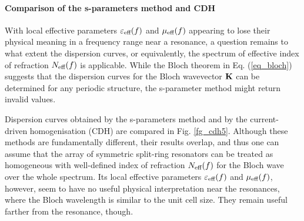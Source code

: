 
\paragraph{Comparison of the s-parameters method and CDH}%
With local effective parameters $\varepsilon_{\text{eff} }(f)$ and $\mu_{\text{eff} }(f)$ appearing to lose their physical meaning in a frequency range near a resonance, a question remains to what extent the dispersion curves, or equivalently, the spectrum of effective index of refraction $N_{\text{eff} }(f)$ is applicable. While the Bloch theorem in Eq. (\ref{eq_bloch}) suggests that the dispersion curves for the Bloch wavevector ${\mathbf{K}}$ can be determined for any periodic structure, the s-parameter method might return invalid values.

Dispersion curves obtained by the s-parameters method and by the current-driven homogenisation (CDH) are compared in Fig. \ref{fg_cdh5}. Although these methods are fundamentally different, their results overlap, and thus one can assume that the array of symmetric split-ring resonators can be treated as homogeneous with well-defined index of refraction $N_{\text{eff} }(f)$ for the Bloch wave over the whole spectrum. Its local effective parameters $\varepsilon_{\text{eff} }(f)$ and $\mu_{\text{eff} }(f)$, however, seem to have no useful physical interpretation near the resonances, where the Bloch wavelength is similar to the unit cell size. They remain useful farther from the resonance, though. %


